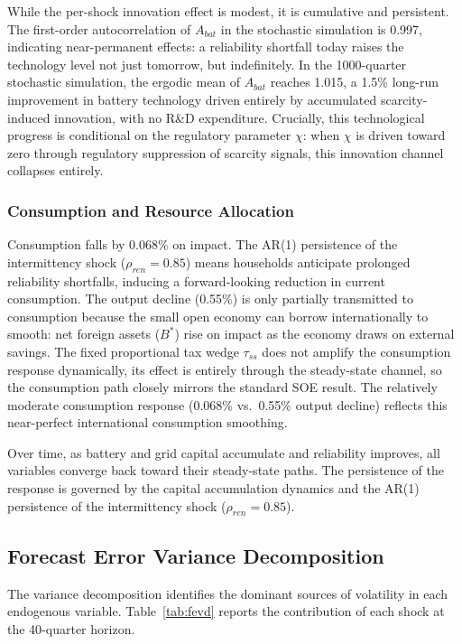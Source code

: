 \documentclass[12pt, a4paper]{article}
\begin{document}
	While the per-shock innovation effect is modest, it is cumulative and persistent. The first-order autocorrelation of $A_{bat}$ in the stochastic simulation is 0.997, indicating near-permanent effects: a reliability shortfall today raises the technology level not just tomorrow, but indefinitely. In the 1000-quarter stochastic simulation, the ergodic mean of $A_{bat}$ reaches 1.015, a 1.5\% long-run improvement in battery technology driven entirely by accumulated scarcity-induced innovation, with no R\&D expenditure. Crucially, this technological progress is conditional on the regulatory parameter $\chi$: when $\chi$ is driven toward zero through regulatory suppression of scarcity signals, this innovation channel collapses entirely.
	
	\subsubsection{Consumption and Resource Allocation}
	
	Consumption falls by 0.068\% on impact. The AR(1) persistence of the intermittency shock ($\rho_{ren}=0.85$) means households anticipate prolonged reliability shortfalls, inducing a forward-looking reduction in current consumption. The output decline (0.55\%) is only partially transmitted to consumption because the small open economy can borrow internationally to smooth: net foreign assets ($B^*$) rise on impact as the economy draws on external savings. The fixed proportional tax wedge $\tau_{ss}$ does not amplify the consumption response dynamically, its effect is entirely through the steady-state channel, so the consumption path closely mirrors the standard SOE result. The relatively moderate consumption response (0.068\% vs.\ 0.55\% output decline) reflects this near-perfect international consumption smoothing.
	
	Over time, as battery and grid capital accumulate and reliability improves, all variables converge back toward their steady-state paths. The persistence of the response is governed by the capital accumulation dynamics and the AR(1) persistence of the intermittency shock ($\rho_{ren} = 0.85$).
	
	\subsection{Forecast Error Variance Decomposition} \label{subsec:fevd}
	
	The variance decomposition identifies the dominant sources of volatility in each endogenous variable. Table~\ref{tab:fevd} reports the contribution of each shock at the 40-quarter horizon.
	
\end{document}
